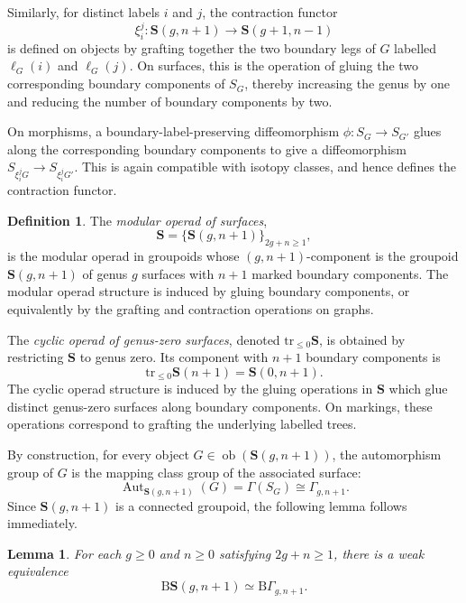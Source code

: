 \documentclass{amsart}
\newcommand{\bS}{\mathbf{S}}
\newcommand{\cs}{\mathrm{B}}
\newcommand{\ob}{\operatorname{ob}}
\newcommand{\Aut}{\operatorname{Aut}}
\newcommand{\trun}[1]{\mathrm{tr}_{\leq{#1}}}
\newtheorem{lemma}[theorem]{Lemma}%
\theoremstyle{definition}
\newtheorem{definition}[theorem]{Definition}%
\numberwithin{equation}{section}
\begin{document}
Similarly, for distinct labels $i$ and $j$, the contraction functor
\[
\xi_i^j:\bS(g,n+1)\longrightarrow \bS(g+1,n-1)
\]
is defined on objects by grafting together the two boundary legs of $G$ labelled
$\ell_G(i)$ and $\ell_G(j)$. On surfaces, this is the operation of gluing the
two corresponding boundary components of $S_G$, thereby increasing the genus by
one and reducing the number of boundary components by two.

On morphisms, a boundary-label-preserving diffeomorphism
$\phi:S_G\to S_{G'}$ glues along the corresponding boundary components to give
a diffeomorphism $S_{\xi_i^jG}\to S_{\xi_i^jG'}$. This is again compatible with
isotopy classes, and hence defines the contraction functor.

\begin{definition}\label{def: modular operad of mapping class groups}
The \emph{modular operad of surfaces}, 
\[
\bS=\{\bS(g,n+1)\}_{2g+n\geq 1},
\]
is the modular operad in groupoids whose $(g,n+1)$-component is the groupoid $\bS(g,n+1)$ of genus $g$ surfaces with $n+1$ marked boundary components.  The modular operad structure is induced by gluing boundary components, or equivalently by the grafting and contraction operations on graphs.

\medskip

The \emph{cyclic operad of genus-zero surfaces}, denoted $\trun{0}\bS$, is
obtained by restricting $\bS$ to genus zero. Its component with $n+1$ boundary
components is
\[
\trun{0}\bS(n+1)=\bS(0,n+1).
\]
The cyclic operad structure is induced by the gluing operations in $\bS$ which glue distinct genus-zero surfaces along boundary components. On markings, these operations correspond to grafting the underlying labelled trees.
\end{definition} 

By construction, for every object $G\in \ob(\bS(g,n+1))$, the automorphism group of
$G$ is the mapping class group of the associated surface:
\[
\Aut_{\bS(g,n+1)}(G)=\Gamma(S_G)\cong \Gamma_{g,n+1}.
\]
Since $\bS(g,n+1)$ is a connected groupoid, the following lemma follows
immediately.

\begin{lemma}
For each $g\geq 0$ and $n\geq 0$ satisfying $2g+n\geq 1$, there is a weak equivalence
\[
\cs\bS(g,n+1)\simeq \cs\Gamma_{g,n+1}.
\]
\end{lemma}

\end{document}
